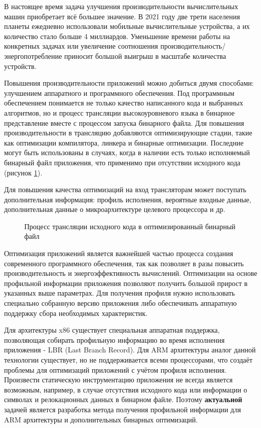 
{\actuality} 
В настоящее время задача улучшения производительности вычислительных машин приобретает всё большее значение. В 2021 году две трети населения планеты ежедневно использовали мобильные вычислительные устройства, а их количество стало больше 4 миллиардов. Уменьшение времени работы на конкретных задачах или увеличение соотношения производительность/энергопотребление приносит большой выигрыш в масштабе количества устройств.

Повышения производительности приложений можно добиться двумя способами: улучшением аппаратного и программного обеспечения. Под программным обеспечением понимается не только качество написанного кода и выбранных алгоритмов, но и процесс трансляции высокоуровневого языка в бинарное представление вместе с процессом запуска бинарного файла. Для повышения производительности в трансляцию добавляются оптимизирующие стадии, такие как оптимизации компилятора, линкера и бинарные оптимизации. Последние могут быть использованы в случаях, когда в наличии есть только исполняемый бинарный файл приложения, что применимо при отсутствии исходного кода (рисунок \cref{fig:Compile}).

Для повышения качества оптимизаций на вход трансляторам может поступать дополнительная информация: профиль исполнения, вероятные входные данные, дополнительная данные о микроархитектуре целевого процессора и др.

\begin{figure}[ht]
    \caption{Процесс трансляции исходного кода в оптимизированный бинарный файл}\label{fig:Compile}
\end{figure}

Оптимизация приложений является важнейшей частью процесса создания современного программного обеспечения, так как позволяет в разы повысить производительность и энергоэффективность вычислений. Оптимизации на основе профильной информации приложения позволяют получить большой прирост в указанных выше параметрах. Для получения профиля нужно использовать специально собранную версию приложения либо обеспечивать аппаратную поддержку сбора необходимых характеристик.

Для архитектуры x86 существует специальная аппаратная поддержка, позволяющая собирать профильную информацию во время исполнения приложения - LBR (Last Branch Record). Для ARM архитектуры аналог данной технологии существует, но не поддерживается всеми процессорами, что создаёт проблемы для оптимизаций приложений с учётом профиля исполнения. Произвести статическую инструментацию приложения не всегда является возможным, например, в случае отсутствия исходного кода или информации о символах и релокационных данных в бинарном файле. Поэтому \textbf{актуальной} задачей является разработка метода получения профильной информации для ARM архитектуры и дополнительных бинарных оптимизаций.

